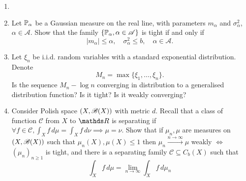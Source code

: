 \begin{exercise} \label{ex:tightness}
\begin{enumerate}
    \item[]
    \item Let $\mathbb{P}_\alpha$ be a Gaussian measure on the real line, with parameters $m_\alpha$ and $\sigma^2_\alpha$, $\alpha \in \mathcal{A}$. Show that the family $\{ \mathbb{P}_\alpha, \alpha \in \mathcal{A}\}$ is tight if and only if 
    \begin{equation*}
        |m_\alpha| \le \alpha, \quad \sigma^2_\alpha \le b, \quad \alpha \in \mathcal{A}.
    \end{equation*}
    \item Let $\xi_n$ be i.i.d. random variables with a standard exponential distribution. Denote
    \begin{equation*}
        M_n = \max \{\xi_1, \dots, \xi_n \}.
    \end{equation*}
    Is the sequence $M_n - \log n$ converging in distribution to a generalised distribution function? Is it tight? Is it weakly converging?
    \item Consider Polish space $(X,\mathcal{B}(X))$ with metric $d$. Recall that a class of function $\mathcal{C}$ from $X$ to $\R$ is separating if $\forall f \in \mathcal{C}, \int_X f \, d\mu = \int_X f\, d\nu \implies \mu = \nu$. Show that if $\mu_n, \mu$ are measures on $(X,\mathcal{B}(X))$ such that $\mu_n(X), \mu(X) \leq 1$ then $\mu_n \overset{n\to\infty}\to \mu$ weakly $\iff$ $(\mu_n)_{n\geq 1}$ is tight, and there is a separating family $\mathcal{C} \subseteq C_b(X)$ such that
    \begin{equation}
        \int_X f \, d\mu = \lim_{n\to\infty} \int_X f \, d\mu_n
    \end{equation}
\end{enumerate}
\end{exercise}

